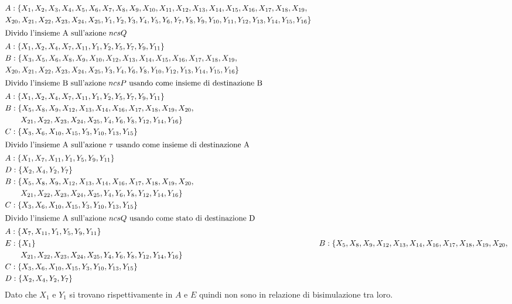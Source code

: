 \documentclass[a4paper]{article}
\begin{document}
\begin{align*}
	&A : \{X_1,X_2,X_3,X_4,X_5,X_6,X_7,X_8,X_9,X_{10},X_{11},X_{12},X_{13},X_{14},X_{15},X_{16},X_{17},X_{18},X_{19},
     \\ &X_{20},X_{21},X_{22},X_{23},X_{24},X_{25},Y_1,Y_2,Y_3,Y_4,Y_5,Y_6,Y_7,Y_8,Y_9,Y_{10},Y_{11},Y_{12},Y_{13},Y_{14},Y_{15},Y_{16}\}\\
     \intertext{Divido l'insieme A sull'azione $ncsQ$}
	&A: \{X_1,X_2,X_4,X_7,X_{11},Y_1,Y_2,Y_5,Y_7,Y_9,Y_{11}\}\\
	&B: \{X_3,X_5,X_6,X_8,X_9,X_{10},X_{12},X_{13},X_{14},X_{15},X_{16},X_{17},X_{18},X_{19},\\&X_{20},X_{21},X_{22},X_{23},X_{24},X_{25},Y_3,Y_4,Y_6,Y_8,Y_{10},Y_{12},Y_{13},Y_{14},Y_{15},Y_{16}\}\\
     \intertext{Divido l'insieme B sull'azione $ncsP$ usando come insieme di destinazione B}
	&A: \{X_1,X_2,X_4,X_7,X_{11},Y_1,Y_2,Y_5,Y_7,Y_9,Y_{11}\}\\
	&B: \{X_5,X_8,X_9,X_{12},X_{13},X_{14},X_{16},X_{17},X_{18},X_{19},X_{20},\\& \qquad X_{21},X_{22},X_{23},X_{24},X_{25},Y_4,Y_6,Y_8,Y_{12},Y_{14},Y_{16}\}\\
	&C: \{X_3,X_6,X_{10},X_{15},Y_3,Y_{10},Y_{13},Y_{15} \}\\
     \intertext{Divido l'insieme A sull'azione $\tau$ usando come insieme di destinazione A}
	&A: \{X_1,X_7,X_{11},Y_1,Y_5,Y_9,Y_{11}\}\\
	&D: \{X_2,X_4,Y_2,Y_7\}\\
	&B: \{X_5,X_8,X_9,X_{12},X_{13},X_{14},X_{16},X_{17},X_{18},X_{19},X_{20},\\& \qquad X_{21},X_{22},X_{23},X_{24},X_{25},Y_4,Y_6,Y_8,Y_{12},Y_{14},Y_{16}\}\\
	&C: \{X_3,X_6,X_{10},X_{15},Y_3,Y_{10},Y_{13},Y_{15} \}\\
     \intertext{Divido l'insieme A sull'azione $ncsQ$ usando come stato di destinazione D}
	&A: \{X_7,X_{11},Y_1,Y_5,Y_9,Y_{11}\}\\
	&E: \{X_1\}
	&B: \{X_5,X_8,X_9,X_{12},X_{13},X_{14},X_{16},X_{17},X_{18},X_{19},X_{20},\\& \qquad X_{21},X_{22},X_{23},X_{24},X_{25},Y_4,Y_6,Y_8,Y_{12},Y_{14},Y_{16}\}\\
	&C: \{X_3,X_6,X_{10},X_{15},Y_3,Y_{10},Y_{13},Y_{15} \}\\
	&D: \{X_2,X_4,Y_2,Y_7\}\\
\end{align*}
Dato che $X_1$ e $Y_1$ si trovano rispettivamente in $A$ e $E$ quindi non sono in relazione di bisimulazione tra loro.
\newpage
\end{document}
